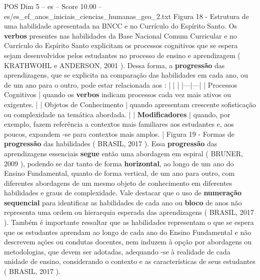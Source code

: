 \begin{textsample}{POS Dim 5 – es – Score 10.00 – es/es\_ef\_anos\_iniciais\_ciencias\_humanas\_geo\_2.txt}
Figura 18 - Estrutura de uma habilidade apresentada na BNCC e no Currículo do Espírito Santo.
Os \textbf{verbos} presentes nas habilidades da Base Nacional Comum Curricular e no Currículo do Espírito Santo explicitam os processos cognitivos que se espera sejam desenvolvidos pelos estudantes no processo de ensino e aprendizagem ( KRATHWOHL e ANDERSON, 2001 ).
Dessa forma, a \textbf{progressão} das aprendizagens, que se explicita na comparação das habilidades em cada ano, ou de um ano para o outro, pode estar relacionada aos : | | | |---|---| | Processos Cognitivos | quando os \textbf{verbos} indicam processos cada vez mais ativos ou exigentes. | | Objetos de Conhecimento | quando apresentam crescente sofisticação ou complexidade na temática abordada. | | \textbf{Modificadores} | quando, por exemplo, fazem referência a contextos mais familiares aos estudantes e, aos poucos, expandem -se para contextos mais amplos. | Figura 19 - Formas de \textbf{progressão} das habilidades ( BRASIL, 2017 ).
Essa \textbf{progressão} das aprendizagens essenciais \textbf{segue} então uma abordagem em espiral ( BRUNER, 2009 ), podendo se dar tanto de forma \textbf{horizontal}, ao longo de um ano do Ensino Fundamental, quanto de forma vertical, de um ano para outro, com diferentes abordagens de um mesmo objeto de conhecimento em diferentes habilidades e graus de complexidade.
Vale destacar que o uso de \textbf{numeração} \textbf{sequencial} para identificar as habilidades de cada ano ou \textbf{bloco} de anos não representa uma ordem ou hierarquia esperada das aprendizagens ( BRASIL, 2017 ).
Também é importante ressaltar que as habilidades representam o que se espera que os estudantes aprendam ao longo de cada ano do Ensino Fundamental e não descrevem ações ou condutas docentes, nem induzem à opção por abordagens ou metodologias, que devem ser adotadas, adequando -se à realidade de cada unidade de ensino, considerando o contexto e as características de seus estudantes ( BRASIL, 2017 ).

\end{textsample}
